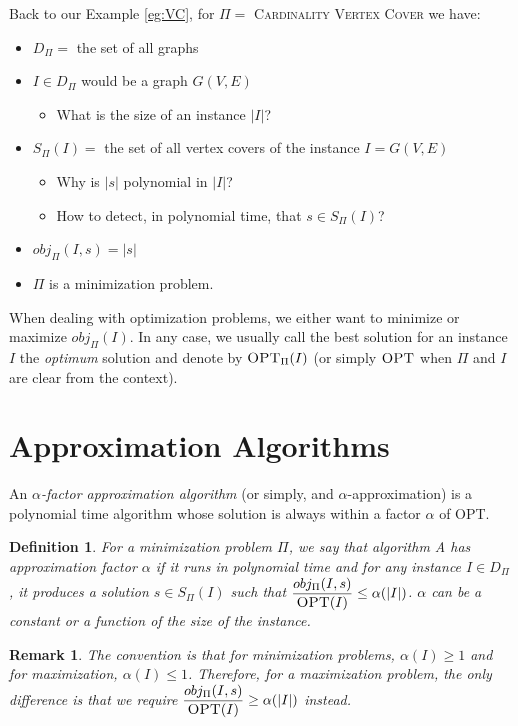 \documentclass[twoside]{article}
\newtheorem{definition}{Definition}
\newtheorem{remarka}{Remark}
\newenvironment{remark}{\begin{remarka}\rm}{\end{remarka}}
\newcommand{\OPT}{\mbox{\sc OPT}}
\newcommand{\abs}[1]{\ensuremath{\left|#1\right|}}
\begin{document}
Back to our Example \ref{eg:VC}, for $\Pi =$ \textsc{Cardinality Vertex Cover} we have:
\begin{itemize}
    \item $D_\Pi =$ the set of all graphs
    \item $I \in D_\Pi$ would be a graph $G(V, E)$
    \begin{itemize}
        \item What is the size of an instance $\abs{I}$?
    \end{itemize}
    \item $S_\Pi(I) =$ the set of all vertex covers of the instance $I = G(V, E)$
    \begin{itemize}
        \item Why is $\abs{s}$ polynomial in $\abs{I}$?
        \item How to detect, in polynomial time, that $s \in S_\Pi(I)$?
    \end{itemize}
    \item $obj_\Pi(I, s) = \abs{s}$
    \item $\Pi$ is a minimization problem.
\end{itemize}

When dealing with optimization problems, we either want to minimize or maximize $obj_\Pi(I)$. In any case, we usually call the best solution for an instance $I$ the \emph{optimum} solution and denote by $\OPT_\Pi(I)$ (or simply $\OPT$ when $\Pi$ and $I$ are clear from the context).

\section{Approximation Algorithms}

An \emph{$\alpha$-factor approximation algorithm} (or simply, and $\alpha$-approximation) is a polynomial time algorithm whose solution is always within a factor $\alpha$ of \OPT.

\begin{definition}
For a minimization problem $\Pi$, we say that algorithm A has approximation factor $\alpha$ if it runs in polynomial time and for any instance $I \in D_\Pi$, it produces a solution $s \in S_\Pi(I)$ such that $\dfrac{obj_\Pi(I, s)}{\OPT(I)} \leq \alpha(\abs{I})$. $\alpha$ can be a constant or a function of the size of the instance.
\end{definition}

\begin{remark}
The convention is that for minimization problems, $\alpha(I) \geq 1$ and for maximization, $\alpha(I) \leq 1$. Therefore, for a maximization problem, the only difference is that we require $\dfrac{obj_\Pi(I, s)}{\OPT(I)} \geq \alpha(\abs{I})$ instead.
\end{remark}
\end{document}
